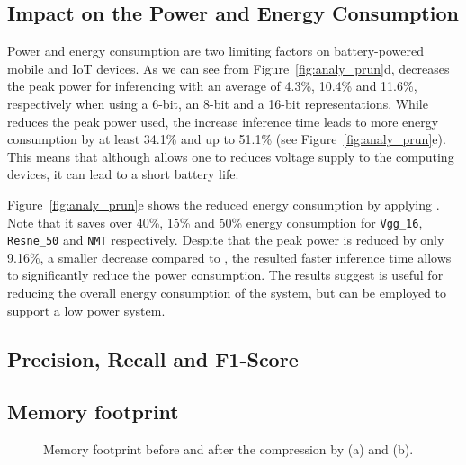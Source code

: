 \subsection{Impact on the Power and Energy Consumption}
Power and energy consumption are two limiting factors on battery-powered mobile and IoT devices. As we can see from
Figure~\ref{fig:analy_prun}d, \quantization decreases the peak power for inferencing with an average of 4.3\%, 10.4\% and 11.6\%,
respectively when using a 6-bit, an 8-bit and a 16-bit representations. While \quantization reduces the peak power used, the increase
inference time leads to more energy consumption by at least 34.1\% and up to 51.1\% (see Figure~\ref{fig:analy_prun}e). This means that
although \quantization allows one to reduces voltage supply to the computing devices, it can lead to a short battery life.

Figure~\ref{fig:analy_prun}e shows the reduced energy consumption by applying \pruning. Note that it saves over 40\%, 15\% and 50\% energy
consumption for \texttt{Vgg\_16}, \texttt{Resne\_50} and \texttt{NMT} respectively. Despite that the peak power is reduced by only 9.16\%,
a smaller decrease compared to \quantization, the resulted faster inference time allows \pruning to significantly reduce the power
consumption. The results suggest \pruning is useful for reducing the overall energy consumption of the system, but \quantization can be
employed to support a low power system.



\subsection{Precision, Recall and F1-Score}



\subsection{Memory footprint}

\begin{figure}[!t]
\centering
{}
\hfill
{}
\hfill

\caption{Memory footprint before and after the compression by \quantization(a) and \pruning (b).}
\label{fig:footprint}
\end{figure}

